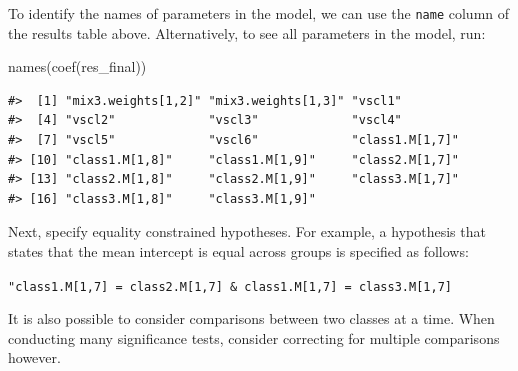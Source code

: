 \documentclass[
  man,floatsintext]{apa6}
\newenvironment{Shaded}{\begin{snugshade}}{\end{snugshade}}
\newcommand{\AttributeTok}[1]{\textcolor[rgb]{0.77,0.63,0.00}{#1}}
\newcommand{\CommentTok}[1]{\textcolor[rgb]{0.56,0.35,0.01}{\textit{#1}}}
\newcommand{\DecValTok}[1]{\textcolor[rgb]{0.00,0.00,0.81}{#1}}
\newcommand{\FunctionTok}[1]{\textcolor[rgb]{0.00,0.00,0.00}{#1}}
\newcommand{\NormalTok}[1]{#1}
\newcommand{\OtherTok}[1]{\textcolor[rgb]{0.56,0.35,0.01}{#1}}
\newcommand{\SpecialCharTok}[1]{\textcolor[rgb]{0.00,0.00,0.00}{#1}}
\newcommand{\StringTok}[1]{\textcolor[rgb]{0.31,0.60,0.02}{#1}}
\begin{document}
To identify the names of parameters in the model,
we can use the \texttt{name} column of the results table above.
Alternatively, to see all parameters in the model, run:

\begin{Shaded}
\begin{Highlighting}[]
\FunctionTok{names}\NormalTok{(}\FunctionTok{coef}\NormalTok{(res\_final))}
\end{Highlighting}
\end{Shaded}

\begin{verbatim}
#>  [1] "mix3.weights[1,2]" "mix3.weights[1,3]" "vscl1"            
#>  [4] "vscl2"             "vscl3"             "vscl4"            
#>  [7] "vscl5"             "vscl6"             "class1.M[1,7]"    
#> [10] "class1.M[1,8]"     "class1.M[1,9]"     "class2.M[1,7]"    
#> [13] "class2.M[1,8]"     "class2.M[1,9]"     "class3.M[1,7]"    
#> [16] "class3.M[1,8]"     "class3.M[1,9]"
\end{verbatim}

Next, specify equality constrained hypotheses.
For example, a hypothesis that states that the mean intercept is equal across groups is specified as follows:

\texttt{"class1.M{[}1,7{]}\ =\ class2.M{[}1,7{]}\ \&\ class1.M{[}1,7{]}\ =\ class3.M{[}1,7{]}}

It is also possible to consider comparisons between two classes at a time.
When conducting many significance tests,
consider correcting for multiple comparisons however.

\begin{Shaded}
\end{Shaded}
\end{document}
